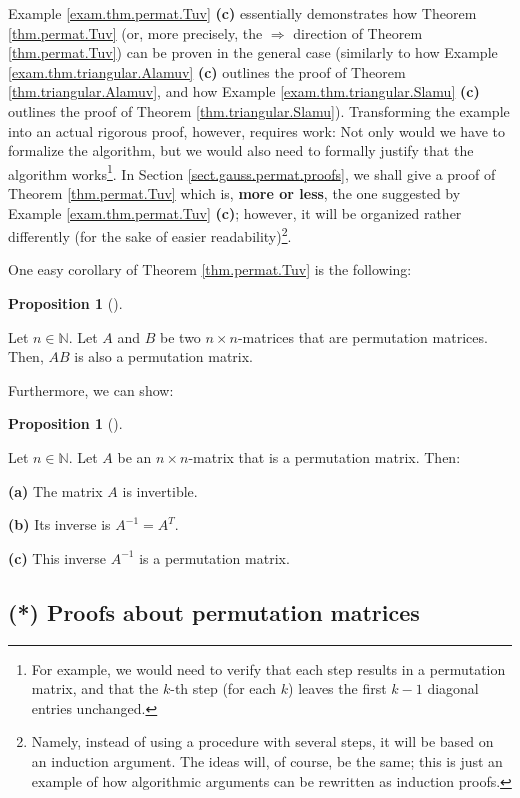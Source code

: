\documentclass[numbers=enddot,12pt,final,onecolumn,notitlepage]{scrartcl}%
\theoremstyle{definition}
\newtheorem{prop}[theo]{Proposition}
\newenvironment{proposition}[1][]
{\begin{prop}[#1]\begin{leftbar}}
{\end{leftbar}\end{prop}}
\begin{document}
Example \ref{exam.thm.permat.Tuv} \textbf{(c)} essentially demonstrates how
Theorem \ref{thm.permat.Tuv} (or, more precisely, the $\Longrightarrow$
direction of Theorem \ref{thm.permat.Tuv}) can be proven in the general case
(similarly to how Example \ref{exam.thm.triangular.Alamuv} \textbf{(c)}
outlines the proof of Theorem \ref{thm.triangular.Alamuv}, and how Example
\ref{exam.thm.triangular.Slamu} \textbf{(c)} outlines the proof of Theorem
\ref{thm.triangular.Slamu}). Transforming the example into an actual rigorous
proof, however, requires work: Not only would we have to formalize the
algorithm, but we would also need to formally justify that the algorithm
works\footnote{For example, we would need to verify that each step results in
a permutation matrix, and that the $k$-th step (for each $k$) leaves the first
$k-1$ diagonal entries unchanged.}. In Section \ref{sect.gauss.permat.proofs},
we shall give a proof of Theorem \ref{thm.permat.Tuv} which is, \textbf{more
or less}, the one suggested by Example \ref{exam.thm.permat.Tuv} \textbf{(c)};
however, it will be organized rather differently (for the sake of easier
readability)\footnote{Namely, instead of using a procedure with several steps,
it will be based on an induction argument. The ideas will, of course, be the
same; this is just an example of how algorithmic arguments can be rewritten as
induction proofs.}.

One easy corollary of Theorem \ref{thm.permat.Tuv} is the following:

\begin{proposition}
\label{prop.permat.AB}Let $n\in\mathbb{N}$. Let $A$ and $B$ be two $n\times
n$-matrices that are permutation matrices. Then, $AB$ is also a permutation matrix.
\end{proposition}

Furthermore, we can show:

\begin{proposition}
\label{prop.permat.inverse}Let $n\in\mathbb{N}$. Let $A$ be an $n\times
n$-matrix that is a permutation matrix. Then:

\textbf{(a)} The matrix $A$ is invertible.

\textbf{(b)} Its inverse is $A^{-1}=A^{T}$.

\textbf{(c)} This inverse $A^{-1}$ is a permutation matrix.
\end{proposition}

\subsection{\label{sect.gauss.permat.proofs}(*) Proofs about permutation
matrices}
\end{document}
